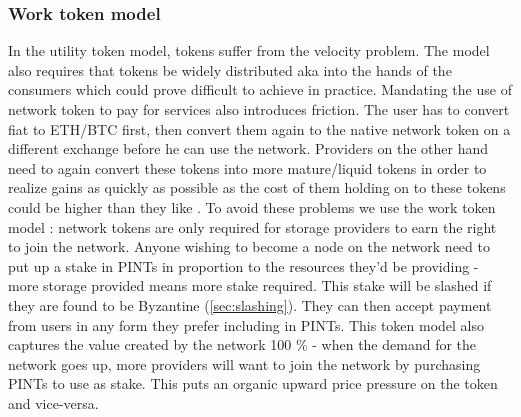\subsubsection{Work token model}
In the utility token model, tokens suffer from the velocity problem. The model also requires that tokens be widely distributed aka into the hands of the consumers which could prove difficult to achieve in practice. Mandating the use of network token to pay for services also introduces friction. The user has to convert fiat to ETH/BTC first, then convert them again to the native network token on a different exchange before he can use the network. Providers on the other hand need to again convert these tokens into more mature/liquid tokens in order to realize gains as quickly as possible as the cost of them holding on to these tokens could be higher than they like \cite{moe}. 
\newline\newline
To avoid these problems we use the work token model \cite{new_model_utility_token}: network tokens are only required for storage providers to earn the right to join the network. Anyone wishing to become a node on the network need to put up a stake in \textsf{PINT}s in proportion to the resources they'd be providing - more storage provided means more stake required. This stake will be slashed if they are found to be Byzantine (\cref{sec:slashing}). They can then accept payment from users in any form they prefer including in \textsf{PINT}s. This token model also captures the value created by the network 100 \% - when the demand for the network goes up, more providers will want to join the network by purchasing \textsf{PINT}s to use as stake. This puts an organic upward price pressure on the token and vice-versa.
